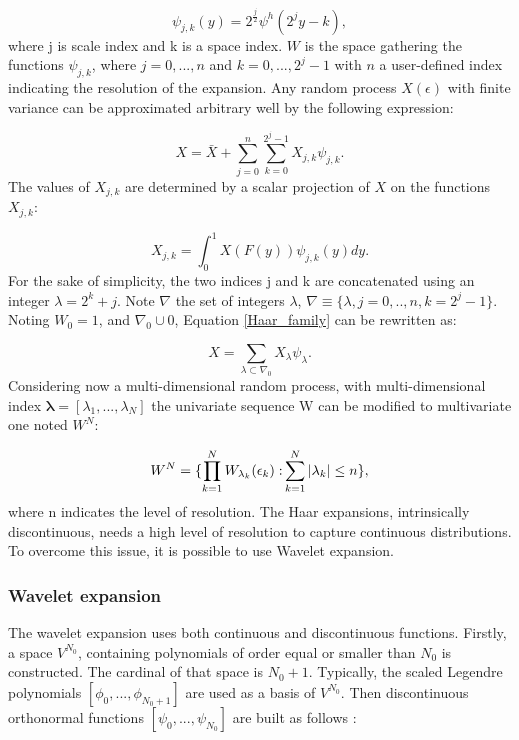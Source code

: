 \documentclass[oneside,11pt,times]{book}
\begin{document}
\begin{equation}
\label{Haar_family}
\psi_{j,k}(y) = 2^{\frac{j}{2}}\psi^{h}(2^{j}y-k),
\end{equation}
where j is scale index  and k is a space index. $W$ is the space gathering the functions $\psi_{j,k}$, where $ j=0,...,n$ and $k = 0,...,2^{j}-1$ with $n$ a user-defined index indicating the resolution of the expansion. Any random process $X(\epsilon)$ with finite variance can be approximated arbitrary well by the following expression:

\begin{equation}
\label{X_Haar_expansion}
X = \bar{X} + \sum_{j=0}^{n}\sum_{k=0}^{2^{j}-1}X_{j,k}\psi_{j,k}.
\end{equation}
The values of $X_{j,k}$ are determined by a scalar projection of $X$ on the functions $X_{j,k}$:

\begin{equation}
\label{Haar_proj}
X_{j,k} = \int_{0}^{1} X\left(F(y)\right)\psi_{j,k}(y)dy .
\end{equation}
For the sake of simplicity, the two indices j and k are concatenated using an integer $\lambda = 2^{k} + j$. Note $\nabla$ the set of integers $\lambda$, $\nabla \equiv \{\lambda, j=0,..,n, k=2^{j}-1\}$. Noting $W_{0} = 1$, and $\nabla_{0} \cup 0$, Equation \eqref{Haar_family} can be rewritten as:

\begin{equation}
\label{X_Haar_final_expansion}
X =  \sum_{\lambda \subset \nabla_{0}}X_{\lambda}\psi_{\lambda}.
\end{equation}
Considering now a multi-dimensional random process, with multi-dimensional index $\bm{\lambda} = [\lambda_{1},...,\lambda_{N}] $ the univariate sequence W can be modified to multivariate one noted $W^{N}$:

\begin{equation}
    W^{N} = \{ \prod_{k=1}^{N} W_{\lambda_{k}}(\epsilon_{k}) \; \textnormal{:} \sum_{k=1}^{N}|\lambda_{k}| \leq n \},
\end{equation}
where n indicates the level of resolution. The Haar expansions, intrinsically discontinuous, needs a high level of resolution to capture continuous distributions. To overcome this issue, it is possible to use Wavelet expansion.

\subsubsection{Wavelet expansion}\label{sec: Wavelet}
The wavelet expansion uses both continuous and discontinuous functions. Firstly, a space $V^{N_{0}}$, containing polynomials of order equal or smaller than $N_{0}$ is constructed. The cardinal of that space is $N_{0}+1$. Typically, the scaled Legendre polynomials $[\phi_{0},...,\phi_{N_{0}+1}]$ are used as a basis of $V^{N_{0}}$. Then discontinuous orthonormal functions $[\psi_{0},...,\psi_{N_{0}}]$ are built as follows :
\end{document}
